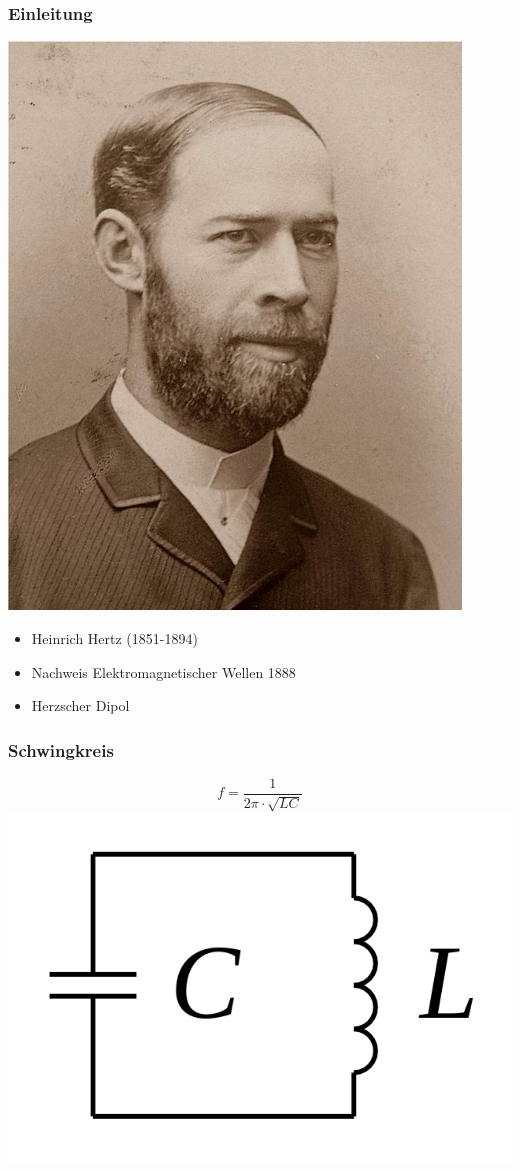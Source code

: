 \begin{frame}
	\frametitle{Einleitung}
\begin{minipage}{0.49\textwidth}
	\includegraphics[width=0.9\textwidth]{e11/HEINRICH_HERTZ.jpg}
\end{minipage}
\begin{minipage}{0.49\textwidth}
	\begin{itemize}
		\item Heinrich Hertz (1851-1894)
		\item Nachweis Elektromagnetischer Wellen 1888	
		\item Herzscher Dipol
	\end{itemize}
\end{minipage}
\end{frame}

\begin{frame}
    \frametitle{Schwingkreis}
    \begin{center} \huge
    $$f = \frac{1}{2  \pi \cdot \sqrt{LC}}$$
        \includegraphics[width=.5\textwidth]{e11/Schwingkreis.png}
	\end{center}
\end{frame}

